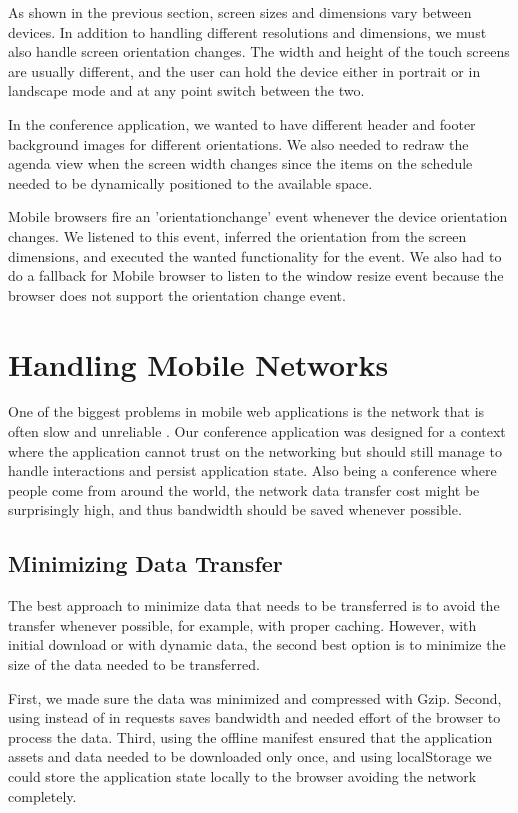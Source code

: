 As shown in the previous section, screen sizes and dimensions vary
between devices. In addition to handling different resolutions and
dimensions, we must also handle screen orientation changes. The width
and height of the touch screens are usually different, and the user
can hold the device either in portrait or in landscape mode and at any
point switch between the two.

In the conference application, we wanted to have different header and
footer background images for different orientations. We also needed to
redraw the agenda view when the screen width changes since the items
on the schedule needed to be dynamically positioned to the available
space.

Mobile browsers fire an 'orientationchange' event whenever the device
orientation changes. We listened to this event, inferred the
orientation from the screen dimensions, and executed the wanted
functionality for the event. We also had to do a fallback for Mobile
 browser to listen to the window resize event because the
browser does not support the orientation change event.

\section{Handling Mobile Networks}
\label{section:handling-networks}

One of the biggest problems in mobile web applications is the network
that is often slow and unreliable \cite{zandy2002reliable}. Our
conference application was designed for a context where the
application cannot trust on the networking but should still manage to
handle interactions and persist application state. Also being a
conference where people come from around the world, the network data
transfer cost might be surprisingly high, and thus bandwidth should be
saved whenever possible.

\subsection{Minimizing Data Transfer}

The best approach to minimize data that needs to be transferred is to
avoid the transfer whenever possible, for example, with proper
caching. However, with initial download or with dynamic data, the
second best option is to minimize the size of the data needed to be
transferred.

First, we made sure the data was minimized and compressed with
Gzip. Second, using  instead of  in 
requests saves bandwidth \cite{charland2011mobile} and needed effort
of the browser to process the data. Third, using the offline manifest
ensured that the application assets and data needed to be downloaded
only once, and using localStorage we could store the application state
locally to the browser avoiding the network completely.

